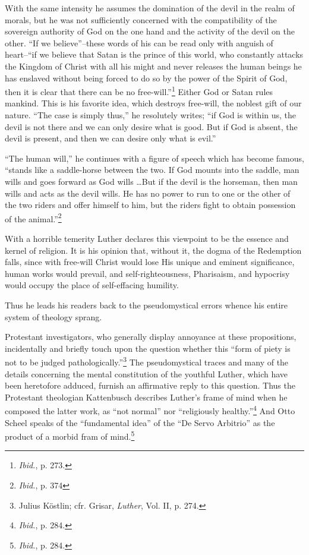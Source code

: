 With the same intensity he assumes the domination of the devil in the
realm of morals, but he was not sufficiently concerned with the compatibility
of the sovereign authority of God on the one hand and the activity of the
devil on the other. “If we believe”--these words of his can be read only with
anguish of heart--``if we believe that Satan is the prince of this world, who
constantly attacks the Kingdom of Christ with all his might and never
releases the human beings he has enslaved without being forced to do so by the
power of the Spirit of God, then it is clear that there can be no free-will.”\footnote{\textit{Ibid.}, p. 273.}
Either God or Satan rules mankind. This is his favorite idea, which destroys
free-will, the noblest gift of our nature. “The case is simply thus,”
he resolutely writes; “if God is within us, the devil is not there and we can only
desire what is good. But if God is absent, the devil is present, and then we
can desire only what is evil.”

“The human will,” he continues with a figure of speech which has become
famous, “stands like a saddle-horse between the two. If God mounts into
the saddle, man wills and goes forward as God wills \dots But if the devil
is the horseman, then man wills and acts as the devil wills. He has no power
to run to one or the other of the two riders and offer himself to him, but
the riders fight to obtain possession of the animal.”\footnote{\textit{Ibid.}, p. 374}

With a horrible temerity Luther declares this viewpoint to be
the essence and kernel of religion. It is his opinion that, without
it, the dogma of the Redemption falls, since with free-will Christ
would lose His unique and eminent significance, human works would
prevail, and self-righteousness, Pharisaism, and hypocrisy would occupy
the place of self-effacing humility.

Thus he leads his readers back to the pseudomystical errors whence
his entire system of theology sprang.

Protestant investigators, who generally display annoyance at these
propositions, incidentally and briefly touch upon the question whether
this “form of piety is not to be judged pathologically.”\footnote
{Julius Köstlin; cfr. Grisar, \textit{Luther}, Vol. II, p. 274.}
The
pseudomystical traces and many of the details concerning the mental
constitution of the youthful Luther, which have been heretofore
adduced, furnish an affirmative reply to this question. Thus the
Protestant theologian Kattenbusch describes Luther’s frame of mind
when he composed the latter work, as “not normal” nor “religiously
healthy.''\footnote{\textit{Ibid.}, p. 284.}
And Otto Scheel speaks of the ``fundamental idea'' of
the ``De Servo Arbitrio'' as the product of a morbid fram of mind.\footnote
{\textit{Ibid.}, p. 284.}

